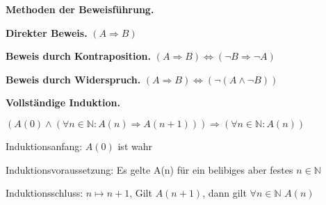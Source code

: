 \textbf{Methoden der Beweisführung.}

\textbf{Direkter Beweis.} $(A \Rightarrow B)$

\textbf{Beweis durch Kontraposition.} $(A \Rightarrow B) \Leftrightarrow (\neg B \Rightarrow \neg A)$

\textbf{Beweis durch Widerspruch.} $(A \Rightarrow B ) \Leftrightarrow (\neg (A \wedge \neg B))$

\textbf{Vollständige Induktion.}

$(A(0) \wedge ( \forall  n \in \mathbb N : A(n) \Rightarrow A(n+1))) \Rightarrow \left(\forall n \in \mathbb N \colon A(n)\right)$

Induktionsanfang: $A(0)$ ist wahr

Induktionsvoraussetzung: Es gelte A(n) für ein belibiges aber festes $n \in \mathbb N$

Induktionsschluss: $n \mapsto n+1$, Gilt $A(n+1)$, dann gilt  $\forall n \in \mathbb{N}$ $A(n)$

